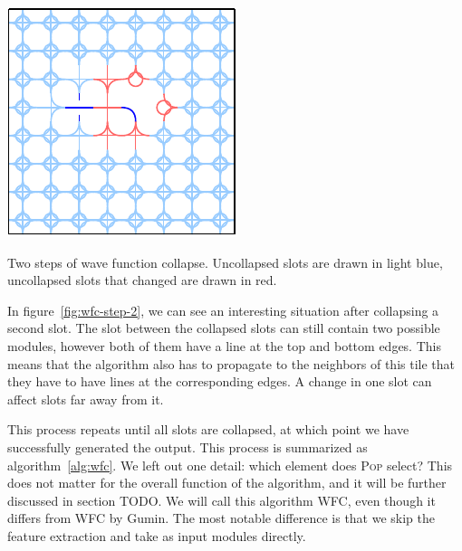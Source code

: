 \begin{center}
\begin{minipage}{.31\textwidth}
         \label{fig:wfc-step-1}
    \end{minipage}%
    \begin{minipage}{.31\textwidth}
        \centering
        \includegraphics[width=0.95\linewidth]{img/WFC step 2.pdf}
         \label{fig:wfc-step-2}
    \end{minipage}
    \caption{Two steps of wave function collapse. Uncollapsed slots are drawn in light blue, uncollapsed slots that changed are drawn in red.}
    \label{fig:wfc-steps}
\end{center}

In figure~\ref{fig:wfc-step-2}, we can see an interesting situation after collapsing a second slot.
The slot between the collapsed slots can still contain two possible modules, however both of them have a line at the top and bottom edges.
This means that the algorithm also has to propagate to the neighbors of this tile that they have to have lines at the corresponding edges.
A change in one slot can affect slots far away from it.

This process repeats until all slots are collapsed, at which point we have successfully generated the output.
This process is summarized as algorithm~\ref{alg:wfc}.
We left out one detail: which element does \textsc{Pop} select?
This does not matter for the overall function of the algorithm, and it will be further discussed in section TODO.
We will call this algorithm WFC, even though it differs from WFC by Gumin.
The most notable difference is that we skip the feature extraction and take as input modules directly.

